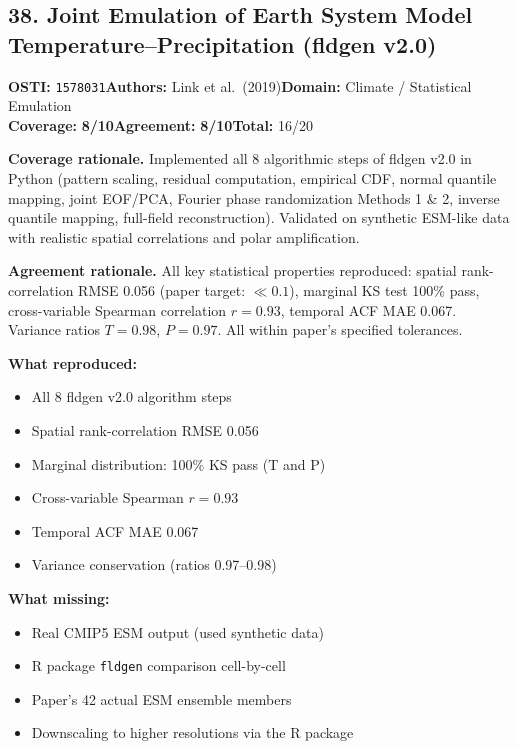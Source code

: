 \documentclass[11pt]{article}
\newcommand{\scorebadge}[2]{\textbf{#1:} \textbf{#2/10}}
\begin{document}
\subsection{38. Joint Emulation of Earth System Model Temperature--Precipitation (fldgen v2.0)}
\textbf{OSTI:} \texttt{1578031}\quad\textbf{Authors:} Link et al.\ (2019)\quad\textbf{Domain:} Climate / Statistical Emulation\\
\scorebadge{Coverage}{8}\quad\scorebadge{Agreement}{8}\quad\textbf{Total:} 16/20\par\smallskip
\noindent\textbf{Coverage rationale.} Implemented all 8 algorithmic steps of fldgen v2.0 in Python (pattern scaling, residual computation, empirical CDF, normal quantile mapping, joint EOF/PCA, Fourier phase randomization Methods 1 \& 2, inverse quantile mapping, full-field reconstruction). Validated on synthetic ESM-like data with realistic spatial correlations and polar amplification.\par
\noindent\textbf{Agreement rationale.} All key statistical properties reproduced: spatial rank-correlation RMSE 0.056 (paper target: $\ll 0.1$), marginal KS test 100\% pass, cross-variable Spearman correlation $r=0.93$, temporal ACF MAE 0.067. Variance ratios $T=0.98$, $P=0.97$. All within paper's specified tolerances.\par\smallskip
\noindent\textbf{What reproduced:}
\begin{itemize}[leftmargin=1.4em,itemsep=0.2em,topsep=0.2em]
\item All 8 fldgen v2.0 algorithm steps
\item Spatial rank-correlation RMSE 0.056
\item Marginal distribution: 100\% KS pass (T and P)
\item Cross-variable Spearman $r=0.93$
\item Temporal ACF MAE 0.067
\item Variance conservation (ratios 0.97--0.98)
\end{itemize}
\noindent\textbf{What missing:}
\begin{itemize}[leftmargin=1.4em,itemsep=0.2em,topsep=0.2em]
\item Real CMIP5 ESM output (used synthetic data)
\item R package \texttt{fldgen} comparison cell-by-cell
\item Paper's 42 actual ESM ensemble members
\item Downscaling to higher resolutions via the R package
\end{itemize}
\end{document}
